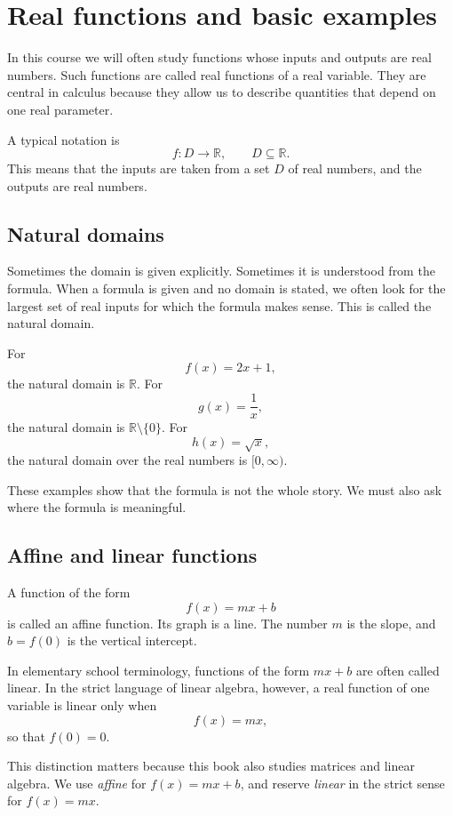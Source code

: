 \section{Real functions and basic examples}

In this course we will often study functions whose inputs and outputs are real numbers. Such functions are called real functions of a real variable. They are central in calculus because they allow us to describe quantities that depend on one real parameter.

A typical notation is
\[
f:D\to\mathbb{R},
\qquad
D\subseteq\mathbb{R}.
\]
This means that the inputs are taken from a set \(D\) of real numbers, and the outputs are real numbers.

\subsection*{Natural domains}

Sometimes the domain is given explicitly. Sometimes it is understood from the formula. When a formula is given and no domain is stated, we often look for the largest set of real inputs for which the formula makes sense. This is called the natural domain.

\begin{examplebox}
For
\[
f(x)=2x+1,
\]
the natural domain is \(\mathbb{R}\). For
\[
g(x)=\frac1x,
\]
the natural domain is \(\mathbb{R}\setminus\{0\}\). For
\[
h(x)=\sqrt{x},
\]
the natural domain over the real numbers is \([0,\infty)\).
\end{examplebox}

These examples show that the formula is not the whole story. We must also ask where the formula is meaningful.

\subsection*{Affine and linear functions}

A function of the form
\[
f(x)=mx+b
\]
is called an affine function. Its graph is a line. The number \(m\) is the slope, and \(b=f(0)\) is the vertical intercept.

In elementary school terminology, functions of the form \(mx+b\) are often called linear. In the strict language of linear algebra, however, a real function of one variable is linear only when
\[
f(x)=mx,
\]
so that \(f(0)=0\).

\begin{remarkbox}
This distinction matters because this book also studies matrices and linear algebra. We use \emph{affine} for \(f(x)=mx+b\), and reserve \emph{linear} in the strict sense for \(f(x)=mx\).
\end{remarkbox}

